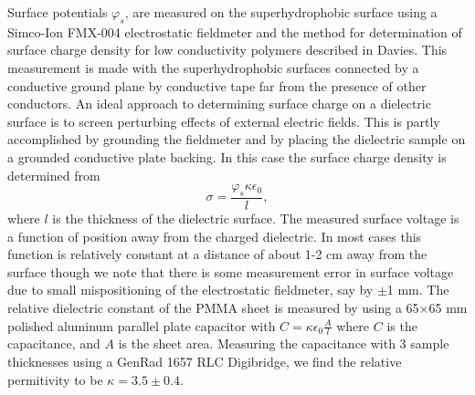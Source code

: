 \documentclass[12pt,a4paper,oneside]{book}
\begin{document}
Surface potentials $\varphi_s$, are measured on the superhydrophobic surface using a Simco-Ion FMX-004 electrostatic fieldmeter and the method for determination of surface charge density for low conductivity polymers described in Davies\cite{davies_examination_1967}. This measurement is made with the superhydrophobic surfaces connected by a conductive ground plane by conductive tape far from the presence of other conductors. An ideal approach to determining surface charge on a dielectric surface is to screen perturbing effects of external electric fields. This is partly accomplished by grounding the fieldmeter and by placing the dielectric sample on a grounded conductive plate backing. In this case the surface charge density is determined from
\[ \sigma = \frac{\varphi_s \kappa \epsilon_0}{l}, \]
where $l$ is the thickness of the dielectric surface. The measured surface voltage is a function of position away from the charged dielectric. In most cases this function is relatively constant at a distance of about 1-2 cm away from the surface though we note that there is some measurement error in surface voltage due to small mispositioning of the electrostatic fieldmeter, say by $\pm$1 mm. The relative dielectric constant of the PMMA sheet is measured by using a 65$\times$65 mm polished aluminum parallel plate capacitor with $C = \kappa \epsilon_0 \frac{A}{l}$ where $C$ is the capacitance, and $A$ is the sheet area. Measuring the capacitance with 3 sample thicknesses using a GenRad 1657 RLC Digibridge, we find the relative permitivity to be $\kappa = 3.5 \pm 0.4$.  
\end{document}
